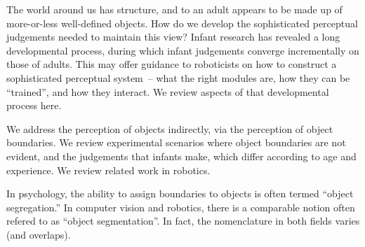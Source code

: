 
The world around us has structure, and to an adult appears to be made
up of more-or-less well-defined objects.  How do we develop the
sophisticated perceptual judgements needed to maintain this view?
%
Infant research has revealed a long developmental process, during
which infant judgements converge incrementally on those of adults.
This may offer guidance to roboticists on how to construct a
sophisticated perceptual system~-- what the right modules are, how
they can be ``trained'', and how they interact.  We review aspects 
of that developmental process here.

We address the perception of objects indirectly, via
the perception of object boundaries.  We review experimental scenarios
where object boundaries are not evident, and the judgements that
infants make, which differ according to age and experience.  We review
related work in robotics.  

In psychology, the ability to assign boundaries to objects is 
often termed
``object segregation.''  In computer vision and robotics, there
is a comparable notion often refered to as ``object segmentation''.
In fact, the nomenclature in both fields varies (and overlaps).
%









